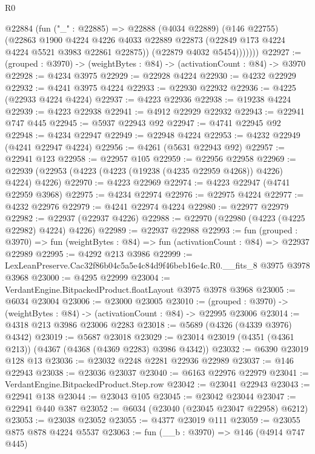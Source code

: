 \begin{lexlean}{R0}
\begin{coremodule}
            @22884
              (fun ("_" : @22885) =>
              @22888
                (@4034 @22889)
                (@146 @22755)
                (@22863
                  @1900
                  @4224
                  @4226
                  @4033
                  @22889
                  @22873
                  (@22849 @173 @4224 @4224 @5521 @3983 @22861 @22875))
                (@22879 @4032 @5454)))))))
@22927 := (grouped : @3970) -> (weightBytes : @84) -> (activationCount : @84) -> @3970
@22928 := @4234 @3975
@22929 := @22928 @4224
@22930 := @4232 @22929
@22932 := @4241 @3975 @4224
@22933 := @22930 @22932
@22936 := @4225 (@22933 @4224 @4224)
@22937 := @4223 @22936
@22938 := @19238 @4224
@22939 := @4223 @22938
@22941 := @4912 @22929 @22932
@22943 := @22941 @747 @445
@22945 := @5937 @22943 @92
@22947 := @4741 @22945 @92
@22948 := @4234 @22947
@22949 := @22948 @4224
@22953 := @4232 @22949 (@4241 @22947 @4224)
@22956 := @4261 (@5631 @22943 @92)
@22957 := @22941 @123
@22958 := @22957 @105
@22959 := @22956 @22958
@22969 := @22939 (@22953 (@4223 (@4223 (@19238 (@4235 @22959 @4268)) @4226) @4224) @4226)
@22970 := @4223 @22969
@22974 := @4223 @22947 (@4741 @22959 @3968)
@22975 := @4234 @22974
@22976 := @22975 @4224
@22977 := @4232 @22976
@22979 := @4241 @22974 @4224
@22980 := @22977 @22979
@22982 := @22937 (@22937 @4226)
@22988 := @22970 (@22980 (@4223 (@4225 @22982) @4224) @4226)
@22989 := @22937 @22988
@22993 := fun (grouped : @3970) =>
  fun (weightBytes : @84) => fun (activationCount : @84) => @22937 @22989
@22995 := @4292 @213 @3986
@22999 := LexLeanPreserve.Cac32f86b04c5a5e4c84d9f46beb16e4c.R0.__fits_8 @3975 @3978 @3968
@23000 := @4295 @22999
@23004 := VerdantEngine.BitpackedProduct.floatLayout @3975 @3978 @3968
@23005 := @6034 @23004
@23006 := @23000 @23005
@23010 := (grouped : @3970) -> (weightBytes : @84) -> (activationCount : @84) -> @22995 @23006
@23014 := @4318 @213 @3986 @23006 @2283
@23018 := @5689 (@4326 (@4339 @3976) @4342)
@23019 := @5687 @23018
@23029 := @23014 @23019 (@4351 (@4361 @213)) (@4367 (@4368 (@4369 @2283) @3986 @4342))
@23032 := @6390 @23019 @128 @13
@23036 := @23032 @2248 @2281 @22936 @22989
@23037 := @146 @22943
@23038 := @23036 @23037
@23040 := @6163 @22976 @22979
@23041 := VerdantEngine.BitpackedProduct.Step.row
@23042 := @23041 @22943
@23043 := @22941 @138
@23044 := @23043 @105
@23045 := @23042 @23044
@23047 := @22941 @440 @387
@23052 := @6034 (@23040 (@23045 @23047 @22958) @6212)
@23053 := @23038 @23052
@23055 := @4377 @23019 @111
@23059 := @23055 @875 @878 @4224 @5537
@23063 := fun (__b : @3970) => @146 (@4914 @747 @445)

\end{coremodule}
\end{lexlean}
